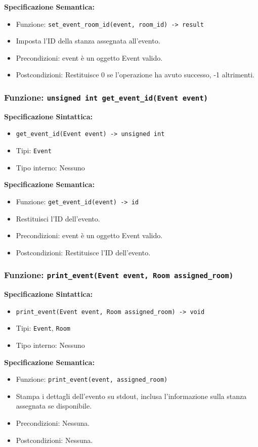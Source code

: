 \documentclass[11pt]{scrartcl} %
\begin{document}
\textbf{Specificazione Semantica:}
\begin{itemize}
\item Funzione: \texttt{set\_event\_room\_id(event, room\_id) -> result}
\item Imposta l'ID della stanza assegnata all'evento.
\item Precondizioni: event è un oggetto Event valido.
\item Postcondizioni: Restituisce 0 se l'operazione ha avuto successo, -1 altrimenti.
\end{itemize}

\subsubsection{Funzione: \texttt{unsigned int get\_event\_id(Event event)}}

\textbf{Specificazione Sintattica:}
\begin{itemize}
\item \texttt{get\_event\_id(Event event) -> unsigned int}
\item Tipi: \texttt{Event}
\item Tipo interno: Nessuno
\end{itemize}

\textbf{Specificazione Semantica:}
\begin{itemize}
\item Funzione: \texttt{get\_event\_id(event) -> id}
\item Restituisci l'ID dell'evento.
\item Precondizioni: event è un oggetto Event valido.
\item Postcondizioni: Restituisce l'ID dell'evento.
\end{itemize}

\subsubsection{Funzione: \texttt{print\_event(Event event, Room assigned\_room)}}

\textbf{Specificazione Sintattica:}
\begin{itemize}
\item \texttt{print\_event(Event event, Room assigned\_room) -> void}
\item Tipi: \texttt{Event}, \texttt{Room}
\item Tipo interno: Nessuno
\end{itemize}

\textbf{Specificazione Semantica:}
\begin{itemize}
\item Funzione: \texttt{print\_event(event, assigned\_room)}
\item Stampa i dettagli dell'evento su stdout, inclusa l'informazione sulla stanza assegnata se disponibile.
\item Precondizioni: Nessuna.
\item Postcondizioni: Nessuna.
\end{itemize}
\end{document}
